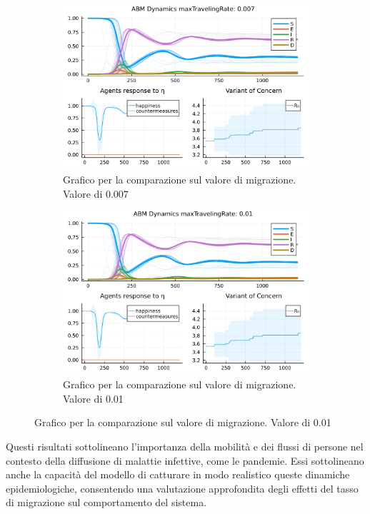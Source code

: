 \begin{figure}[H]
\begin{subfigure}[b]{0.45\textwidth}
		\includegraphics[width=\textwidth]{img/SocialNetworkABM_3_MTR.jpg}
		\caption{Grafico per la comparazione sul valore di migrazione. Valore di 0.007}
		\label{fig:comparison_maxTravelingRate_midh}
	\end{subfigure}
	\hfill
	\begin{subfigure}[b]{0.45\textwidth}
		\centering
		\includegraphics[width=\textwidth]{img/SocialNetworkABM_4_MTR.jpg}
		\caption{Grafico per la comparazione sul valore di migrazione. Valore di 0.01}
		\label{fig:comparison_maxTravelingRate_high}
	\end{subfigure}
\end{figure}

Questi risultati sottolineano l'importanza della mobilità e dei flussi 
di persone nel contesto della diffusione di malattie infettive, come le 
pandemie. Essi sottolineano anche la capacità del modello di catturare 
in modo realistico queste dinamiche epidemiologiche, consentendo una 
valutazione approfondita degli effetti del tasso di migrazione sul 
comportamento del sistema.

